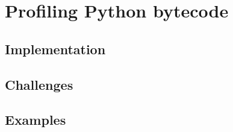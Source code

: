 \chapter{Profiling Python bytecode} %
\label{chap:profiling-bytecode}



\section{Implementation}
\label{sec:profiling-bytecode-implementation}




\section{Challenges}
\label{sec:profiling-bytecode-challenges}





\section{Examples}
\label{sec:profiling-bytecode-examples}



